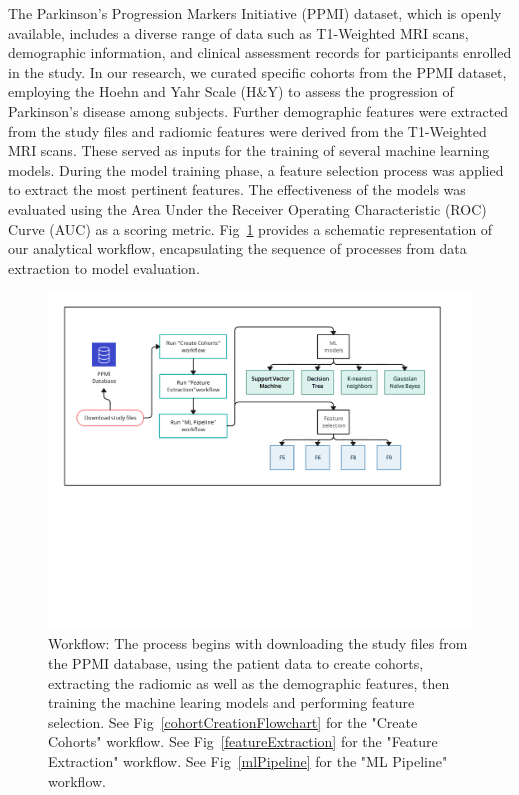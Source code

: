 The Parkinson's Progression Markers Initiative (PPMI) dataset, which is openly available, includes a diverse range of data such as T1-Weighted MRI scans, demographic information, 
and clinical assessment records for participants enrolled in the study. In our research, we curated specific cohorts from the PPMI dataset, employing the Hoehn and Yahr Scale (H\&Y) 
to assess the progression of Parkinson's disease among subjects. Further demographic features were extracted from the study files and radiomic features were derived from the T1-Weighted 
MRI scans. These served as inputs for the training of several machine learning models. During the model training phase, a feature selection process was applied to extract the most 
pertinent features. The effectiveness of the models was evaluated using the Area Under the Receiver Operating Characteristic (ROC) Curve (AUC) as a scoring metric. 
Fig~\ref{modelOverview} provides a schematic representation of our analytical workflow, encapsulating the sequence of processes from data extraction to model evaluation.

\begin{figure}[!ht]
    \centering
    \includegraphics[trim=0 320 0 0, clip, width=\linewidth]{images/Methods_workflow.pdf}
    \caption{Workflow: The process begins with downloading the study files from the PPMI database, using the patient data to create cohorts, extracting the radiomic as well as the 
    demographic features, then training the machine learing models and performing feature selection. See Fig~\ref{cohortCreationFlowchart} for the "Create Cohorts" workflow. See 
    Fig~\ref{featureExtraction} for the "Feature Extraction" workflow. See Fig~\ref{mlPipeline} for the "ML Pipeline" workflow. }
    \label{modelOverview}
\end{figure}
